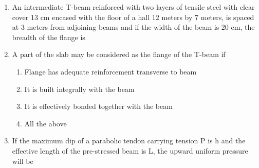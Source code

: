 \documentclass[11pt,a4paper]{article}
\begin{document}
\begin{enumerate}
\item{An intermediate T-beam reinforced with two layers of tensile steel with clear cover 13 cm encased with the floor of a hall 12 meters by 7 meters, is spaced at 3 meters from adjoining beams and if the width of the beam is 20 cm, the breadth of the flange is}
\\\begin{enumerate*}[itemjoin=\qquad, label=\Alph*.]
\item{300 cm}
\item{233 cm}
\item{176 cm}
\item{236 cm}
\end{enumerate*}
\item{A part of the slab may be considered as the flange of the T-beam if}
\begin{enumerate}[label=\Alph*.]
\item{Flange has adequate reinforcement transverse to beam}
\item{It is built integrally with the beam}
\item{It is effectively bonded together with the beam}
\item{All the above}
\end{enumerate}
\item{If the maximum dip of a parabolic tendon carrying tension P is h and the effective length of the pre-stressed beam is L, the upward uniform pressure will be}
\\
\end{enumerate}
\end{document}
